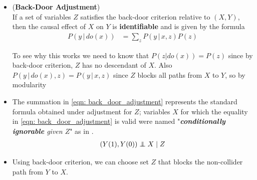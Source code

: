 \documentclass[11pt]{article}
\begin{document}
\begin{itemize}
\item \begin{theorem} (\textbf{Back-Door Adjustment}) \citep{pearl2000causal, neal2020introduction}\\
If a set of variables $Z$ satisfies the back-door criterion relative to $(X, Y)$, then the causal effect of $X$ on $Y$ is \textbf{identifiable} and is given by the formula
\begin{align}
P(y\,|\, do(x)) &= \sum_{z}P(y\,|\,x,  z)P(z) \label{eqn: back_door_adjustment}
\end{align}
\end{theorem} To see why this works we need to know that $P(z| do(x)) = P(z)$ since by back-door criterion, $Z$ has no descendant of $X$. Also $P(y\,|\,do(x),  z) = P(y\,|\,x,  z)$ since $Z$ blocks all paths from $X$ to $Y$, so by modularity 

\item The summation in \eqref{eqn: back_door_adjustment} represents the standard formula obtained under adjustment for $Z$; variables $X$ for which the equality in \eqref{eqn: back_door_adjustment} is valid were named "\emph{\textbf{conditionally ignorable} given $Z$}" as in \citep{imbens2015causal}.
\begin{align*}
(Y(1), Y(0)) \indep X \;|\; Z 
\end{align*}

\item Using back-door criterion, we can choose set $Z$ that blocks the non-collider path from $Y$ to $X$.
\end{itemize}
\end{document}
